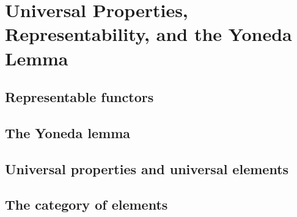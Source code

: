 \documentclass[../main]{subfiles}
\begin{document}
\chapter{Universal Properties, Representability, and the Yoneda Lemma}
\section{Representable functors}






\pagebreak
\section{The Yoneda lemma}







\pagebreak
\section{Universal properties and universal elements}




\pagebreak
\section{The category of elements}










\end{document}
